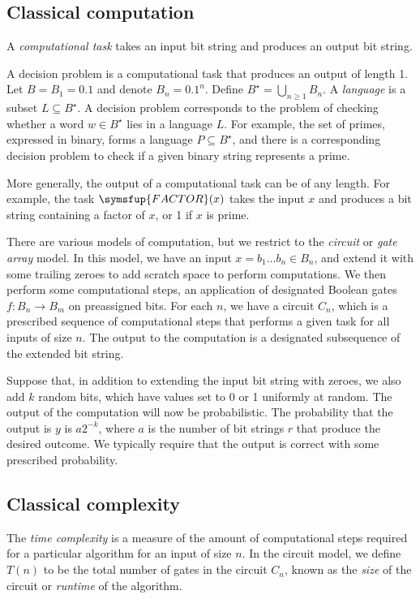 \subsection{Classical computation}
A \emph{computational task} takes an input bit string and produces an output bit string.

A decision problem is a computational task that produces an output of length 1.
Let \( B = B_1 = \qty{0,1} \) and denote \( B_n = \qty{0,1}^n \).
Define \( B^\star = \bigcup_{n \geq 1} B_n \).
A \emph{language} is a subset \( L \subseteq B^\star \).
A decision problem corresponds to the problem of checking whether a word \( w \in B^\star \) lies in a language \( L \).
For example, the set of primes, expressed in binary, forms a language \( P \subseteq B^\star \), and there is a corresponding decision problem to check if a given binary string represents a prime.

More generally, the output of a computational task can be of any length.
For example, the task \( \symsfup{FACTOR}(x) \) takes the input \( x \) and produces a bit string containing a factor of \( x \), or 1 if \( x \) is prime.

There are various models of computation, but we restrict to the \emph{circuit} or \emph{gate array} model.
In this model, we have an input \( x = b_1 \dots b_n \in B_n \), and extend it with some trailing zeroes to add scratch space to perform computations.
We then perform some computational steps, an application of designated Boolean gates \( f \colon B_n \to B_m \) on preassigned bits.
For each \( n \), we have a circuit \( C_n \), which is a prescribed sequence of computational steps that performs a given task for all inputs of size \( n \).
The output to the computation is a designated subsequence of the extended bit string.

Suppose that, in addition to extending the input bit string with zeroes, we also add \( k \) random bits, which have values set to 0 or 1 uniformly at random.
The output of the computation will now be probabilistic.
The probability that the output is \( y \) is \( a2^{-k} \), where \( a \) is the number of bit strings \( r \) that produce the desired outcome.
We typically require that the output is correct with some prescribed probability.

\subsection{Classical complexity}
The \emph{time complexity} is a measure of the amount of computational steps required for a particular algorithm for an input of size \( n \).
In the circuit model, we define \( T(n) \) to be the total number of gates in the circuit \( C_n \), known as the \emph{size} of the circuit or \emph{runtime} of the algorithm.

